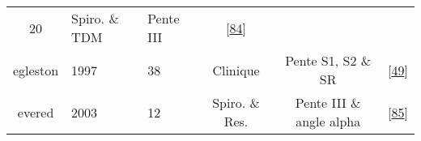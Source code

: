 \documentclass[12pt,]{article}
\begin{document}
\begin{landscape}
\begin{longtable}[]{@{}cllccl@{}}
\begin{minipage}[t]{0.08\columnwidth}
20\strut
\end{minipage} & \begin{minipage}[t]{0.14\columnwidth}\centering
Spiro. \& TDM\strut
\end{minipage} & \begin{minipage}[t]{0.40\columnwidth}\centering
Pente III\strut
\end{minipage} & \begin{minipage}[t]{0.08\columnwidth}\raggedright
{[}\protect\hyperlink{ref-brown2013forced}{84}{]}\strut
\end{minipage}\tabularnewline
\begin{minipage}[t]{0.09\columnwidth}\centering
egleston\strut
\end{minipage} & \begin{minipage}[t]{0.05\columnwidth}\raggedright
1997\strut
\end{minipage} & \begin{minipage}[t]{0.08\columnwidth}\raggedright
38\strut
\end{minipage} & \begin{minipage}[t]{0.14\columnwidth}\centering
Clinique\strut
\end{minipage} & \begin{minipage}[t]{0.40\columnwidth}\centering
Pente S1, S2 \& SR\strut
\end{minipage} & \begin{minipage}[t]{0.08\columnwidth}\raggedright
{[}\protect\hyperlink{ref-egleston1997capnography}{49}{]}\strut
\end{minipage}\tabularnewline
\begin{minipage}[t]{0.09\columnwidth}\centering
evered\strut
\end{minipage} & \begin{minipage}[t]{0.05\columnwidth}\raggedright
2003\strut
\end{minipage} & \begin{minipage}[t]{0.08\columnwidth}\raggedright
12\strut
\end{minipage} & \begin{minipage}[t]{0.14\columnwidth}\centering
Spiro. \& Res.\strut
\end{minipage} & \begin{minipage}[t]{0.40\columnwidth}\centering
Pente III \& angle alpha\strut
\end{minipage} & \begin{minipage}[t]{0.08\columnwidth}\raggedright
{[}\protect\hyperlink{ref-evered2003can}{85}{]}\strut
\end{minipage}\tabularnewline

\end{longtable}
\end{landscape}
\end{document}

